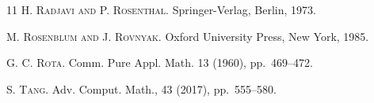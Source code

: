 \documentclass[a4paper,12pt]{amsart}
\theoremstyle{definition}
\begin{document}
\begin{thebibliography}{11}
\textsc{H. Radjavi and P. Rosenthal.} 
Springer-Verlag, Berlin, 1973.

\textsc{M. Rosenblum and J. Rovnyak.} 
Oxford University Press, New York, 1985.



\textsc{G. C. Rota.}
Comm. Pure Appl. Math. 13 (1960), pp.~469--472.

\textsc{S. Tang.}
Adv. Comput. Math., 43 (2017), pp.~555--580.
 
\end{thebibliography}
\end{document}
